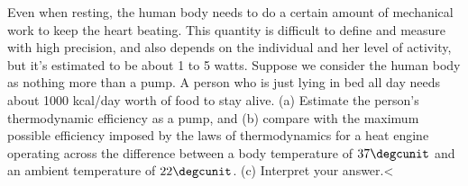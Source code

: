 Even when resting, the human body needs to do a certain amount of mechanical
work to keep the heart beating. This quantity is difficult to define and
measure with high precision, and also depends on the individual and
her level of activity,
but it's estimated to be about 1 to 5 watts. Suppose we consider the human
body as nothing more than a pump. A person who is just lying in bed all
day needs about 1000 kcal/day worth of food to stay alive.
(a) Estimate the person's thermodynamic efficiency as a pump, and (b) compare with
the maximum possible efficiency imposed by the laws of thermodynamics for
a heat engine operating across the difference between a body
temperature of $37\degcunit$ and an ambient temperature of
$22\degcunit$. (c) Interpret your answer.<%
